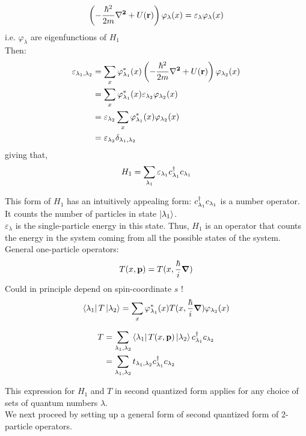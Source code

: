 \begin{equation}
	\left(-\frac{\hbar^2}{2m} \vb{\laplacian}+ U(\vb{r})  \right) \varphi_\lambda(x) = \varepsilon_\lambda \varphi_\lambda(x)
\end{equation}
i.e. ${\varphi_\lambda}$ are eigenfunctions of $H_1$\\
\linebreak
\noindent Then:
\begin{align}
	\varepsilon_{\lambda_1, \lambda_2} &= \sum_x \varphi_{\lambda_1}^*(x)  \left(-\frac{\hbar^2}{2m} \vb{\laplacian}+ U(\vb{r})  \right) \varphi_{\lambda_2} (x)\\
	&=  \sum_x \varphi_{\lambda_1}^*(x) \varepsilon_{\lambda_2} \varphi_{\lambda_2}(x) \nonumber \\
	&= \varepsilon_{\lambda_2} \sum_x \varphi_{\lambda_1}^*(x) \varphi_{\lambda_2}(x)\nonumber \\
	&= \varepsilon_{\lambda_2} \delta_{\lambda_1, \lambda_2} \nonumber
\end{align}
giving that, 
\begin{equation}
	H_1 = \sum_{\lambda_1} \varepsilon_{\lambda_1} c^{\dagger}_{\lambda_1} c_{\lambda_1}
\end{equation}

\noindent This form of $H_1$ has an intuitively appealing form: $  c^{\dagger}_{\lambda_1} c_{\lambda_1}$ is a number operator. It counts the number of particles in state $\ket{\lambda_1}$.\\
\noindent $\varepsilon_\lambda$ is the single-particle energy in this state. Thus, $H_1$ is an operator that counts the energy in the system coming from all the possible states of the system.\\
\linebreak
\noindent General one-particle operators:
\begin{equation}
	T(x, \vb{p}) = T(x, \frac{\hbar}{i} \vb{\gradient}) 
\end{equation}
Could in principle depend on spin-coordinate $s$ !
\begin{equation}
	\bra{\lambda_1} T \ket{\lambda_2} = \sum_x \varphi_{\lambda_1}^*(x) T(x, \frac{\hbar}{i} \vb{\gradient}) \varphi_{\lambda_2}(x)
\end{equation}

\begin{tcolorbox}
	\begin{align}
		T &= \sum_{\lambda_1,\lambda_2} \bra{\lambda_1} T(x, \vb{p}) \ket{\lambda_2} c^{\dagger}_{\lambda_1} c_{\lambda_2}\\
		&=\sum_{\lambda_1,\lambda_2} t_{\lambda_1,\lambda_2} c^{\dagger}_{\lambda_1} c_{\lambda_2} \nonumber
	\end{align}
\end{tcolorbox}
\noindent This expression for $H_1$ and $T$ in second quantized form applies for any choice of sets of quantum numbers $\lambda$.\\
\linebreak
\noindent We next proceed by setting up a general form of second quantized form of 2-particle operators.


